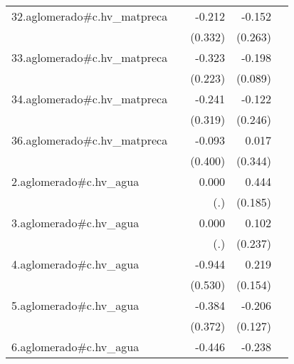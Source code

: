{\begin{longtable}{l*{4}{D{.}{.}{-1}}}
\addlinespace
32.aglomerado#c.hv\_matpreca&                     &      -0.212         &      -0.152         &                     \\
            &                     &     (0.332)         &     (0.263)         &                     \\
\addlinespace
33.aglomerado#c.hv\_matpreca&                     &      -0.323         &      -0.198\sym{*}  &                     \\
            &                     &     (0.223)         &     (0.089)         &                     \\
\addlinespace
34.aglomerado#c.hv\_matpreca&                     &      -0.241         &      -0.122         &                     \\
            &                     &     (0.319)         &     (0.246)         &                     \\
\addlinespace
36.aglomerado#c.hv\_matpreca&                     &      -0.093         &       0.017         &                     \\
            &                     &     (0.400)         &     (0.344)         &                     \\
\addlinespace
2.aglomerado#c.hv\_agua&                     &       0.000         &       0.444\sym{*}  &                     \\
            &                     &         (.)         &     (0.185)         &                     \\
\addlinespace
3.aglomerado#c.hv\_agua&                     &       0.000         &       0.102         &                     \\
            &                     &         (.)         &     (0.237)         &                     \\
\addlinespace
4.aglomerado#c.hv\_agua&                     &      -0.944         &       0.219         &                     \\
            &                     &     (0.530)         &     (0.154)         &                     \\
\addlinespace
5.aglomerado#c.hv\_agua&                     &      -0.384         &      -0.206         &                     \\
            &                     &     (0.372)         &     (0.127)         &                     \\
\addlinespace
6.aglomerado#c.hv\_agua&                     &      -0.446         &      -0.238         &                     \\

\end{longtable}}
